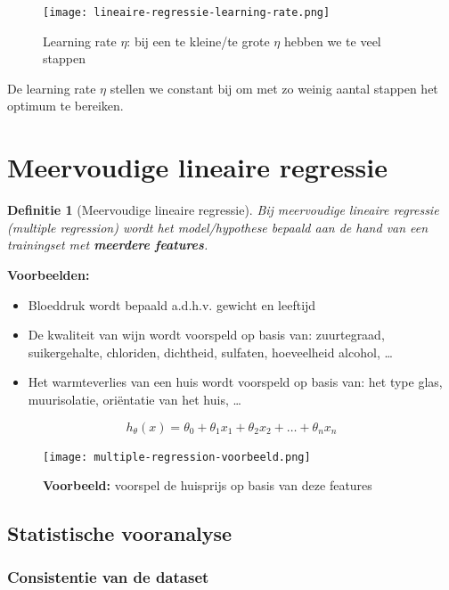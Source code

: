 \documentclass{article}
\newtheorem{theorem}{Definitie}[section]
\begin{document}
\begin{figure}[H]
    \centering
    \texttt{[image: lineaire-regressie-learning-rate.png]}
    \caption{Learning rate $\eta$: bij een te kleine/te grote $\eta$ hebben we te veel stappen}
\end{figure}

De learning rate $\eta$ stellen we constant bij om met zo weinig aantal stappen het optimum te bereiken.


\section{Meervoudige lineaire regressie}

\begin{theorem}[Meervoudige lineaire regressie]
Bij meervoudige lineaire regressie (multiple regression) wordt het model/hypothese bepaald 
aan de hand van een trainingset met \textbf{meerdere features}.
\end{theorem}

\textbf{Voorbeelden:}

\begin{itemize}
    \item Bloeddruk wordt bepaald a.d.h.v. gewicht en leeftijd
    \item De kwaliteit van wijn wordt voorspeld op basis van: zuurtegraad, suikergehalte, chloriden, dichtheid, sulfaten, hoeveelheid alcohol, \dots
    \item Het warmteverlies van een huis wordt voorspeld op basis van: het type glas, muurisolatie, oriëntatie van het huis, \dots
\end{itemize}

\begin{equation}
h_{\theta}(x) = \theta_0 + \theta_1x_1 + \theta_2x_2 + \dots + \theta_nx_n 
\end{equation}

\begin{figure}[H]
    \centering
    \texttt{[image: multiple-regression-voorbeeld.png]}
    \caption{\textbf{Voorbeeld:} voorspel de huisprijs op basis van deze features }
\end{figure}

\subsection{Statistische vooranalyse}

\subsubsection{Consistentie van de dataset}
\end{document}
